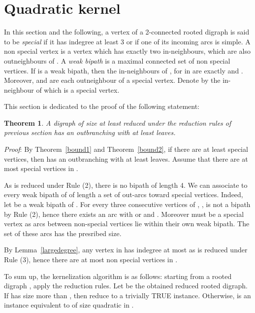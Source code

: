 \documentclass{article}
\newtheorem{theorem}{Theorem}
\begin{document}
\section{Quadratic kernel}\label{skernel}

In this section and the following, a vertex of a 2-connected rooted digraph  is said to be \emph{special} if it has indegree at least 3 or if one of its incoming arcs is simple. A non special vertex is a vertex  which has exactly two in-neighbours, which are also outneighbours of . A \emph{weak bipath} is a maximal connected set of non special vertices. If  is a weak bipath, then the in-neighbours of , for  in  are exactly  and . Moreover,  and  are each outneighbour of a special vertex. Denote by  the in-neighbour of  which is a special vertex.



This section is dedicated to the proof of the following statement:

\begin{theorem}\label{kernel}
A digraph  of size at least  reduced under the reduction rules of previous section has an outbranching with at least  leaves.
\end{theorem}

\emph{Proof}:
By Theorem~\ref{bound1} and Theorem~\ref{bound2}, if there are at least  special vertices, then  has an outbranching with at least  leaves. Assume that there are at most  special vertices in . 

As  is reduced under Rule (2), there is no bipath of length 4. We can associate to every weak bipath  of  of length  a set  of  out-arcs toward special vertices. Indeed,  let  be a weak bipath of . For every three consecutive vertices  of , ,  is not a bipath by Rule (2), hence there exists an arc  with  or  and . Moreover  must be a special vertex as arcs between non-special vertices lie within their own weak bipath. The set of these arcs  has the presribed size.

By Lemma~\ref{largedegree}, any vertex in  has indegree at most  as  is reduced under Rule (3), hence there are at most  non special vertices in .



\vspace{12pt}




To sum up, the kernelization algorithm is as follows: starting from a rooted digraph , apply the reduction rules. Let  be the obtained reduced rooted digraph. If  has size more than , then reduce to a trivially TRUE instance. Otherwise,  is an instance equivalent to  of size quadratic in .
\end{document}
